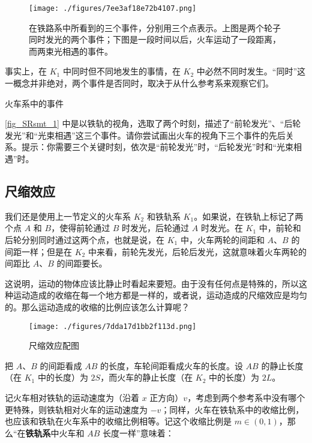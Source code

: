 \begin{figure}[ht]
\centering
\texttt{[image: ./figures/7ee3af18e72b4107.png]}
\caption{在铁路系中所看到的三个事件，分别用三个点表示。上图是两个轮子同时发光的两个事件；下图是一段时间以后，火车运动了一段距离，而两束光相遇的事件。} \label{fig_SRsmt_1}
\end{figure}

事实上，在 $K_1$ 中同时但不同地发生的事情，在 $K_2$ 中必然不同时发生。“同时”这一概念并非绝对，两个事件是否同时，取决于从什么参考系来观察它们。

\begin{exercise}{火车系中的事件}

\autoref{fig_SRsmt_1} 中是以铁轨的视角，选取了两个时刻，描述了“前轮发光”、“后轮发光”和“光束相遇”这三个事件。请你尝试画出火车的视角下三个事件的先后关系。提示：你需要三个关键时刻，依次是“前轮发光”时，“后轮发光”时和“光束相遇”时。

\end{exercise}

\subsection{尺缩效应}

我们还是使用上一节定义的火车系 $K_2$ 和铁轨系 $K_1$。如果说，在铁轨上标记了两个点 $A$ 和 $B$，使得前轮通过 $B$ 时发光，后轮通过 $A$ 时发光。在 $K_1$ 中，前轮和后轮分别同时通过这两个点，也就是说，在 $K_1$ 中，火车两轮的间距和 $A$、$B$ 的间距一样；但是在 $K_2$ 中来看，前轮先发光，后轮后发光，这就意味着火车两轮的间距比 $A$、$B$ 的间距要长。

这说明，运动的物体应该比静止时看起来要短。由于没有任何点是特殊的，所以这种运动造成的收缩在每一个地方都是一样的，或者说，运动造成的尺缩效应是均匀的。那么运动造成的收缩的比例应该怎么计算呢？

\begin{figure}[ht]
\centering
\texttt{[image: ./figures/7dda17d1bb2f113d.png]}
\caption{尺缩效应配图} \label{fig_SRsmt_2}
\end{figure}

把 $A$、$B$ 的间距看成 $AB$ 的长度，车轮间距看成火车的长度。设 $AB$ 的静止长度（在 $K_1$ 中的长度）为 $2S$，而火车的静止长度（在 $K_2$ 中的长度）为 $2L$。

记火车相对铁轨的运动速度为（沿着 $x$ 正方向）$v$，考虑到两个参考系中没有哪个更特殊，则铁轨相对火车的运动速度为 $-v$；同样，火车在铁轨系中的收缩比例，也应该和铁轨在火车系中的收缩比例相等。记这个收缩比例是 $m\in(0,1)$，那么“在\textbf{铁轨系}中火车和 $AB$ 长度一样”意味着：

